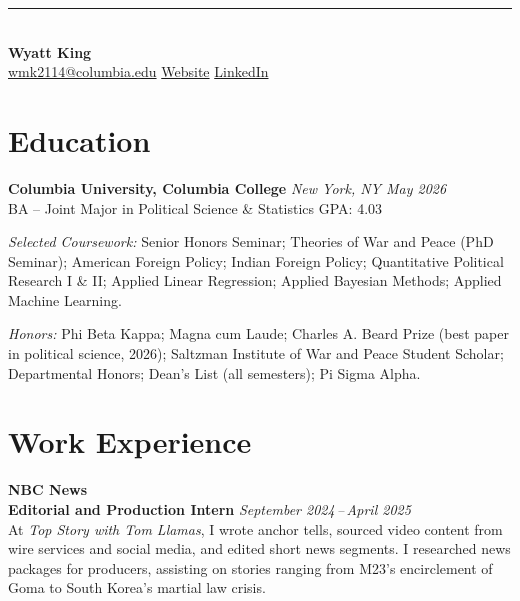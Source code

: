 \documentclass[11pt, letterpaper]{article}
\newcommand{\role}[2]{%
  \textbf{#1} \hfill \textit{#2}%
}
\newcommand{\employer}[1]{%
  \textbf{\large #1}%
}
\begin{document}
\noindent\rule{36pt}{2.5pt}\\[6pt]
{\LARGE\bfseries Wyatt King}\\[4pt]
\small\href{mailto:wmk2114@columbia.edu}{wmk2114@columbia.edu}
\enspace\textperiodcentered\enspace
\href{https://wmk2114.github.io/my-site/main.html}{Website}
\enspace\textperiodcentered\enspace
\href{https://www.linkedin.com/in/wyatt-king-790955263/}{LinkedIn}
\normalsize

\vspace{6pt}

\section*{Education}

\role{Columbia University, Columbia College}{New York, NY \hspace{2pt} May 2026}\\
BA -- Joint Major in Political Science \& Statistics \hfill GPA: 4.03

\vspace{3pt}
\textit{Selected Coursework:} Senior Honors Seminar; Theories of War and Peace (PhD Seminar); American Foreign Policy; Indian Foreign Policy; Quantitative Political Research I \& II; Applied Linear Regression; Applied Bayesian Methods; Applied Machine Learning.

\vspace{3pt}
\textit{Honors:} Phi Beta Kappa; Magna cum Laude; Charles A. Beard Prize (best paper in political science, 2026); Saltzman Institute of War and Peace Student Scholar; Departmental Honors; Dean's List (all semesters); Pi Sigma Alpha.

\section*{Work Experience}

\employer{NBC News}\\
\role{Editorial and Production Intern}{September 2024\,--\,April 2025}\\
At \textit{Top Story with Tom Llamas}, I wrote anchor tells, sourced video content from wire services and social media, and edited short news segments. I researched news packages for producers, assisting on stories ranging from M23's encirclement of Goma to South Korea's martial law crisis.
\end{document}
